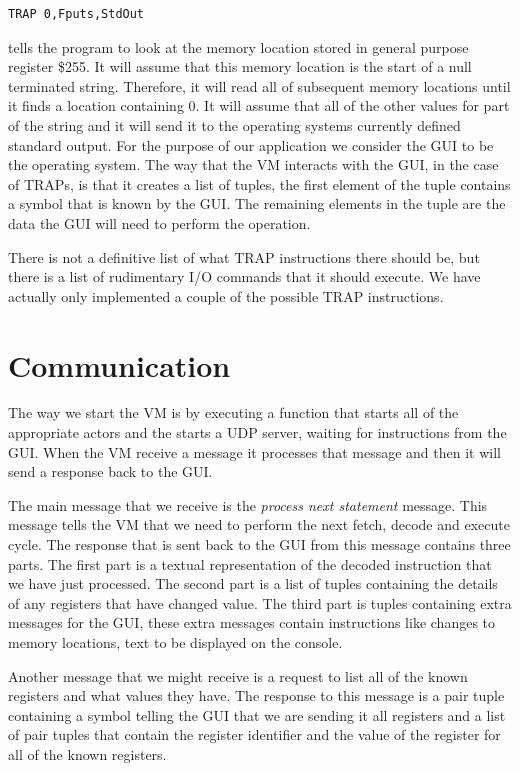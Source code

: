 \documentclass[a4paper,11pt]{report}
\begin{document}
\begin{lstlisting}
TRAP 0,Fputs,StdOut
\end{lstlisting}
tells the program to look at the memory location stored in general purpose register \$255. It will assume that this memory location is the start of a null terminated string. Therefore, it will read all of subsequent memory locations until it finds a location containing 0. It will assume that all of the other values for part of the string and it will send it to the operating systems currently defined standard output.
\clearpage
For the purpose of our application we consider the GUI to be the operating system. The way that the VM interacts with the GUI, in the case of TRAPs, is that it creates a list of tuples, the first element of the tuple contains a symbol that is known by the GUI. The remaining elements in the tuple are the data the GUI will need to perform the operation.

There is not a definitive list of what TRAP instructions there should be, but there is a list of rudimentary I/O commands that it should execute. We have actually only implemented a couple of the possible TRAP instructions.
\section{Communication}
The way we start the VM is by executing a function that starts all of the appropriate actors and the starts a UDP server, waiting for instructions from the GUI. When the VM receive a message it processes that message and then it will send a response back to the GUI. 

The main message that we receive is the \textit{process next statement} message. This message tells the VM that we need to perform the next fetch, decode and execute cycle. The response that is sent back to the GUI from this message contains three parts. The first part is a textual representation of the decoded instruction that we have just processed. The second part is a list of tuples containing the details of any registers that have changed value. The third part is tuples containing extra messages for the GUI, these extra messages contain instructions like changes to memory locations, text to be displayed on the console.

Another message that we might receive is a request to list all of the known registers and what values they have. The response to this message is a pair tuple containing a symbol telling the GUI that we are sending it all registers and a list of pair tuples that contain the register identifier and the value of the register for all of the known registers.
\end{document}
